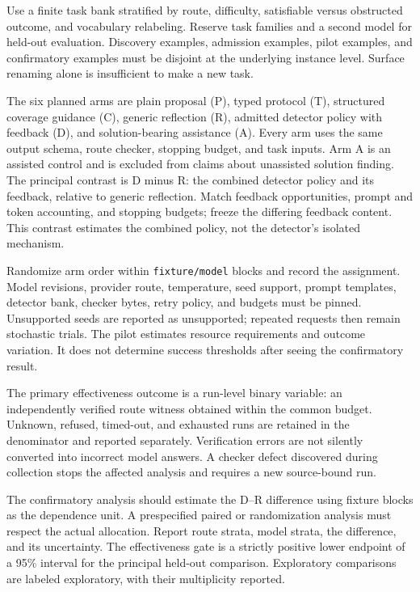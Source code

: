 \documentclass[
  11pt,
]{article}
\begin{document}
Use a finite task bank stratified by route, difficulty, satisfiable
versus obstructed outcome, and vocabulary relabeling. Reserve task
families and a second model for held-out evaluation. Discovery examples,
admission examples, pilot examples, and confirmatory examples must be
disjoint at the underlying instance level. Surface renaming alone is
insufficient to make a new task.

The six planned arms are plain proposal (P), typed protocol (T),
structured coverage guidance (C), generic reflection (R), admitted
detector policy with feedback (D), and solution-bearing assistance (A).
Every arm uses the same output schema, route checker, stopping budget,
and task inputs. Arm A is an assisted control and is excluded from
claims about unassisted solution finding. The principal contrast is D
minus R: the combined detector policy and its feedback, relative to
generic reflection. Match feedback opportunities, prompt and token
accounting, and stopping budgets; freeze the differing feedback content.
This contrast estimates the combined policy, not the detector's isolated
mechanism.

Randomize arm order within \nolinkurl{fixture/model} blocks and record
the assignment. Model revisions, provider route, temperature, seed
support, prompt templates, detector bank, checker bytes, retry policy,
and budgets must be pinned. Unsupported seeds are reported as
unsupported; repeated requests then remain stochastic trials. The pilot
estimates resource requirements and outcome variation. It does not
determine success thresholds after seeing the confirmatory result.

The primary effectiveness outcome is a run-level binary variable: an
independently verified route witness obtained within the common budget.
Unknown, refused, timed-out, and exhausted runs are retained in the
denominator and reported separately. Verification errors are not
silently converted into incorrect model answers. A checker defect
discovered during collection stops the affected analysis and requires a
new source-bound run.

The confirmatory analysis should estimate the D--R difference using
fixture blocks as the dependence unit. A prespecified paired or
randomization analysis must respect the actual allocation. Report route
strata, model strata, the difference, and its uncertainty. The
effectiveness gate is a strictly positive lower endpoint of a 95\%
interval for the principal held-out comparison. Exploratory comparisons
are labeled exploratory, with their multiplicity reported.
\end{document}
